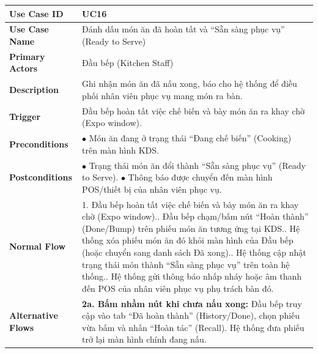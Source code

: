 \begin{longtable}{|p{3.5cm}|p{12.5cm}|}
\hline
\textbf{Use Case ID} & UC16 \\ \hline
\textbf{Use Case Name} & Đánh dấu món ăn đã hoàn tất và ``Sẵn sàng phục vụ'' (Ready to Serve) \\ \hline
\textbf{Primary Actors} & Đầu bếp (Kitchen Staff) \\ \hline
\textbf{Description} & Ghi nhận món ăn đã nấu xong, báo cho hệ thống để điều phối nhân viên phục vụ mang món ra bàn. \\ \hline
\textbf{Trigger} & Đầu bếp hoàn tất việc chế biến và bày món ăn ra khay chờ (Expo window). \\ \hline
\textbf{Preconditions} & $\bullet$ Món ăn đang ở trạng thái ``Đang chế biến'' (Cooking) trên màn hình KDS. \\ \hline
\textbf{Postconditions} &
$\bullet$ Trạng thái món ăn đổi thành ``Sẵn sàng phục vụ'' (Ready to Serve).\newline
$\bullet$ Thông báo được chuyển đến màn hình POS/thiết bị của nhân viên phục vụ. \\ \hline
\textbf{Normal Flow} &
1. Đầu bếp hoàn tất việc chế biến và bày món ăn ra khay chờ (Expo window).\newline
2. Đầu bếp chạm/bấm nút ``Hoàn thành'' (Done/Bump) trên phiếu món ăn tương ứng tại KDS.\newline
3. Hệ thống xóa phiếu món ăn đó khỏi màn hình của Đầu bếp (hoặc chuyển sang danh sách Đã xong).\newline
4. Hệ thống cập nhật trạng thái món thành ``Sẵn sàng phục vụ'' trên toàn hệ thống.\newline
5. Hệ thống gửi thông báo nhấp nháy hoặc âm thanh đến POS của nhân viên phục vụ phụ trách bàn đó. \\ \hline
\textbf{Alternative Flows} &
\textbf{2a. Bấm nhầm nút khi chưa nấu xong:} Đầu bếp truy cập vào tab ``Đã hoàn thành'' (History/Done), chọn phiếu vừa bấm và nhấn ``Hoàn tác'' (Recall). Hệ thống đưa phiếu trở lại màn hình chính đang nấu. \\ \hline
\end{longtable}

